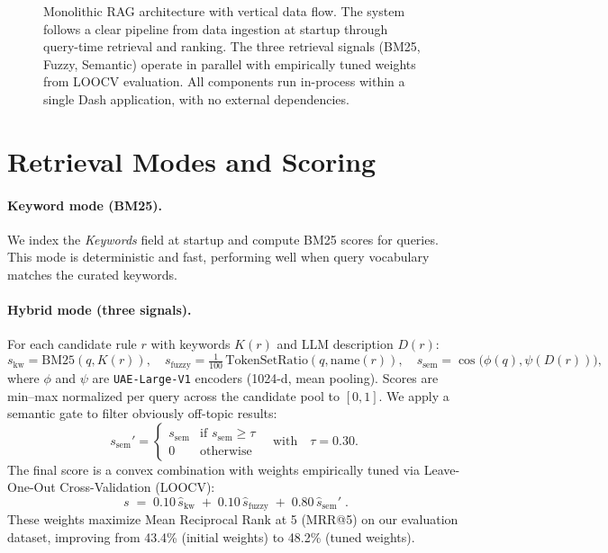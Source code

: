 \begin{figure}[t]
\begin{tikzpicture}
\end{tikzpicture}
\caption{Monolithic RAG architecture with vertical data flow. The system follows a clear pipeline from data ingestion at startup through query-time retrieval and ranking. The three retrieval signals (BM25, Fuzzy, Semantic) operate in parallel with empirically tuned weights from LOOCV evaluation. All components run in-process within a single Dash application, with no external dependencies.}
\label{fig:intro-architecture}
\end{figure}

\section{Retrieval Modes and Scoring}
\paragraph{Keyword mode (BM25).} We index the \emph{Keywords} field at startup and compute BM25 scores for queries. This mode is deterministic and fast, performing well when query vocabulary matches the curated keywords.

\paragraph{Hybrid mode (three signals).} For each candidate rule $r$ with keywords $K(r)$ and LLM description $D(r)$:
\[
s_{\text{kw}} = \mathrm{BM25}(q, K(r)),\quad
s_{\text{fuzzy}} = \tfrac{1}{100}\,\mathrm{TokenSetRatio}(q, \mathrm{name}(r)),\quad
s_{\text{sem}} = \cos\!\big(\phi(q), \psi(D(r))\big),
\]
where $\phi$ and $\psi$ are \texttt{UAE-Large-V1} encoders (1024-d, mean pooling). Scores are min–max normalized per query across the candidate pool to $[0,1]$. We apply a semantic gate to filter obviously off-topic results:
\[
s_{\text{sem}}' = \begin{cases}
s_{\text{sem}} & \text{if } s_{\text{sem}} \ge \tau \\
0 & \text{otherwise}
\end{cases}
\quad \text{with} \quad \tau = 0.30.
\]
The final score is a convex combination with weights empirically tuned via Leave-One-Out Cross-Validation (LOOCV):
\[
\boxed{ \; s \;=\; 0.10\,\widehat{s}_{\text{kw}} \;+\; 0.10\,\widehat{s}_{\text{fuzzy}} \;+\; 0.80\,\widehat{s}_{\text{sem}}' \; }.
\]
These weights maximize Mean Reciprocal Rank at 5 (MRR@5) on our evaluation dataset, improving from 43.4\% (initial weights) to 48.2\% (tuned weights).

